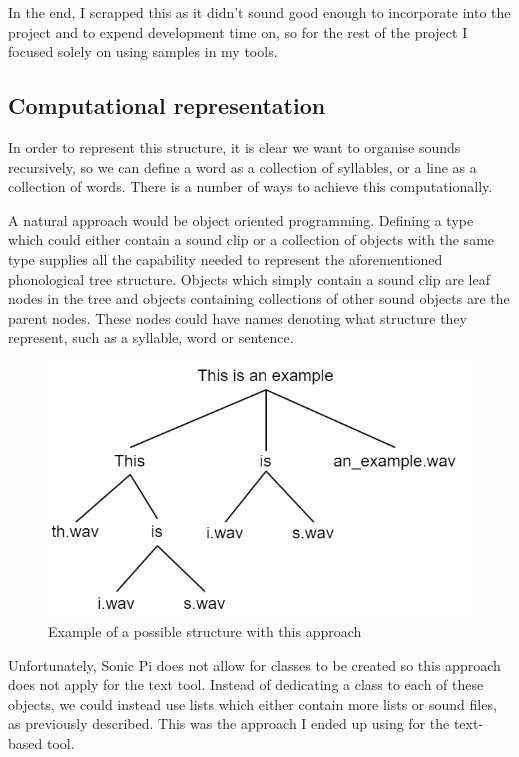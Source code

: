 \documentclass[12pt,a4paper,twoside,openright]{report}
\begin{document}
In the end, I scrapped this as it didn't sound good enough to incorporate into the project and to expend development time on, so for the rest of the project I focused solely on using samples in my tools.

\subsection{Computational representation}
In order to represent this structure, it is clear we want to organise sounds recursively, so we can define a word as a collection of syllables, or a line as a collection of words. There is a number of ways to achieve this computationally.

A natural approach would be object oriented programming. Defining a type which could either contain a sound clip or a collection of objects with the same type supplies all the capability needed to represent the aforementioned phonological tree structure. Objects which simply contain a sound clip are leaf nodes in the tree and objects containing collections of other sound objects are the parent nodes. These nodes could have names denoting what structure they represent, such as a syllable, word or sentence.

\begin{figure}[h]
    \centering
    \includegraphics[scale=0.5]{images/tree_structure_example.png}
    \caption{Example of a possible structure with this approach}
    \label{fig:tree_struct_ex}
\end{figure}

Unfortunately, Sonic Pi does not allow for classes to be created so this approach does not apply for the text tool. Instead of dedicating a class to each of these objects, we could instead use lists which either contain more lists or sound files, as previously described. This was the approach I ended up using for the text-based tool.
\end{document}
